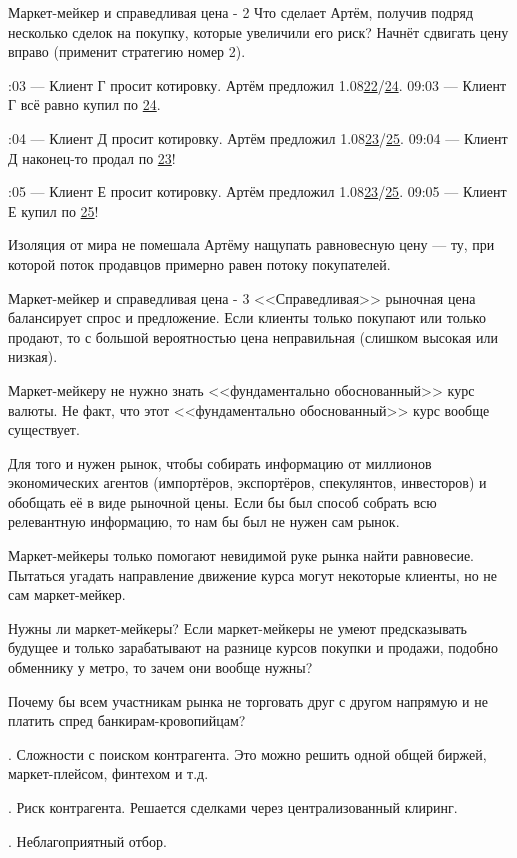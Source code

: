 \documentclass{beamer}
\newcommand{\eurusdBigFigures}{1.08}
\begin{document}
\begin{frame}{Маркет-мейкер и справедливая цена - 2}
\justify
Что сделает Артём, получив подряд несколько сделок на покупку, которые увеличили 
его риск? Начнёт сдвигать цену вправо (применит стратегию номер 2).

:03 --- Клиент Г просит котировку. Артём предложил \eurusdBigFigures\underline{22}/\underline{24}.
09:03 --- Клиент Г всё равно купил по \underline{24}.

:04 --- Клиент Д просит котировку. Артём предложил \eurusdBigFigures\underline{23}/\underline{25}.
09:04 --- Клиент Д наконец-то продал по \underline{23}!

:05 --- Клиент Е просит котировку. Артём предложил \eurusdBigFigures\underline{23}/\underline{25}.
09:05 --- Клиент Е купил по \underline{25}!

\justify
Изоляция от мира не помешала Артёму нащупать равновесную цену --- ту, при которой поток продавцов примерно равен потоку покупателей.
\end{frame}



\begin{frame}{Маркет-мейкер и справедливая цена - 3}
\justify
<<Справедливая>> рыночная цена балансирует спрос и предложение.
Если клиенты только покупают или только продают, то с большой вероятностью цена 
неправильная (слишком высокая или низкая).

\justify
Маркет-мейкеру не нужно знать <<фундаментально обоснованный>> курс валюты. Не факт, что этот <<фундаментально обоснованный>> курс вообще существует.

\justify
Для того и нужен рынок, чтобы собирать информацию от миллионов экономических 
агентов (импортёров, экспортёров, спекулянтов, инвесторов) и обобщать её в виде
рыночной цены. Если бы был способ собрать всю релевантную информацию, то нам бы
был не нужен сам рынок.

\justify
Маркет-мейкеры только помогают невидимой руке рынка найти равновесие. Пытаться 
угадать направление движение курса могут некоторые клиенты, но не сам маркет-мейкер.
\end{frame}



\begin{frame}{Нужны ли маркет-мейкеры?}
\justify
Если маркет-мейкеры не умеют предсказывать будущее и только зарабатывают на 
разнице курсов покупки и продажи, подобно обменнику у метро, то зачем они вообще 
нужны?

\justify
Почему бы всем участникам рынка не торговать друг с другом напрямую и не платить
спред банкирам-кровопийцам?

. Сложности с поиском контрагента. Это можно решить одной общей биржей,
маркет-плейсом, финтехом и т.д.

. Риск контрагента. Решается сделками через централизованный клиринг.

. Неблагоприятный отбор.
\end{frame}
\end{document}
